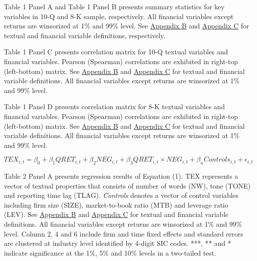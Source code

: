 

Table 1 Panel A and Table 1 Panel B presents summary statistics for key variables in 10-Q and 8-K sample, respectively. All financial variables except returns are winsorized at 1\% and 99\% level. See \hyperref[appb]{Appendix B} and \hyperref[appc]{Appendix C} for textual and financial variable definitions, respectively.

\newpage
\begin{landscape}

Table 1 Panel C presents correlation matrix for 10-Q textual variables and financial variables. Pearson (Spearman) correlations are exhibited in right-top (left-bottom) matrix. See \hyperref[appb]{Appendix B} and \hyperref[appc]{Appendix C} for textual and financial variable definitions. All financial variables except returns are winsorized at 1\% and 99\% level. 
\end{landscape}

\newpage
	
	Table 1 Panel D presents correlation matrix for 8-K textual variables and financial variables. Pearson (Spearman) correlations are exhibited in right-top (left-bottom) matrix. See \hyperref[appb]{Appendix B} and \hyperref[appc]{Appendix C} for textual and financial variable definitions. All financial variables except returns are winsorized at 1\% and 99\% level. 

\newpage

\setcounter{equation}{0}
\begin{equation}
TEX_{i,t}=\beta_0+\beta_1QRET_{i,t}+\beta_2NEG_{i,t}+\beta_3QRET_{i,t}\times NEG_{i,t}+\beta_nControls_{i,t}+\epsilon_{i,t}
\end{equation}

Table 2 Panel A presents regression results of Equation (1). TEX represents a vector of textual properties that consists of number of words (NW), tone (TONE) and reporting time lag (TLAG). \textit{Controls} denotes a vector of control variables including firm size (SIZE), market-to-book ratio (MTB) and leverage ratio (LEV). See \hyperref[appb]{Appendix B} and \hyperref[appc]{Appendix C} for textual and financial variable definitions. All financial variables except returns are winsorized at 1\% and 99\% level. Column 2, 4 and 6 include firm and time fixed effects and standard errors are clustered at industry level identified by 4-digit SIC codes. ***, ** and * indicate significance at the 1\%, 5\% and 10\% levels in a two-tailed test.

